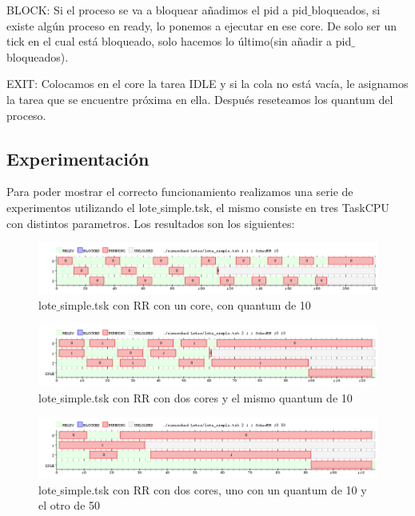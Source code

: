 BLOCK: Si el proceso se va a bloquear añadimos el pid a pid$\_$bloqueados, si existe algún proceso en ready, lo ponemos a ejecutar en ese core. De solo ser un tick en el cual
está bloqueado, solo hacemos lo último(sin añadir a pid$\_$bloqueados).

EXIT: Colocamos en el core la tarea IDLE y si la cola no está vacía, le asignamos la tarea que se encuentre próxima en ella. Después reseteamos los quantum del proceso.


\subsection{Experimentación}

Para poder mostrar el correcto funcionamiento realizamos una serie de experimentos utilizando el lote$\_$simple.tsk, el mismo consiste en tres TaskCPU con distintos parametros.
Los resultados son los siguientes:


\begin{figure}[H]
  \centering
    \includegraphics[width=1.1\textwidth]{imagenes/Ej4Experimento1.png}
  \caption{lote$\_$simple.tsk con RR con un core, con quantum de 10}
\end{figure}

\begin{figure}[H]
  \centering
    \includegraphics[width=1.1\textwidth]{imagenes/Ej4Experimento2.png}
  \caption{lote$\_$simple.tsk con RR con dos cores y el mismo quantum de 10}
\end{figure}

\begin{figure}[H]
  \centering
    \includegraphics[width=1.1\textwidth]{imagenes/Ej4Experimento3.png}
  \caption{lote$\_$simple.tsk con RR con dos cores, uno con un quantum de 10 y el otro de 50}
\end{figure}

